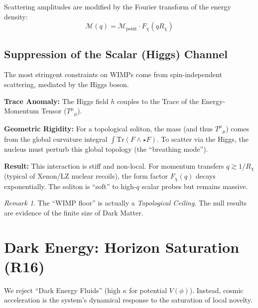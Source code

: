 \documentclass[11pt,a4paper]{article}
\theoremstyle{definition}
\theoremstyle{plain}
\theoremstyle{remark}
\newtheorem{remark}{Remark}
\newcommand{\effort}{\kappa}
\begin{document}
Scattering amplitudes are modified by the Fourier transform of the energy density:
\begin{equation}
    \mathcal{M}(q) = \mathcal{M}_{\mathrm{point}} \cdot F_\chi(q R_\chi)
\end{equation}

\subsection{Suppression of the Scalar (Higgs) Channel}

The most stringent constraints on WIMPs come from spin-independent scattering, mediated by the Higgs boson.

\textbf{Trace Anomaly:} The Higgs field $h$ couples to the Trace of the Energy-Momentum Tensor ($T^\mu{}_\mu$).

\textbf{Geometric Rigidity:} For a topological soliton, the mass (and thus $T^\mu{}_\mu$) comes from the global curvature integral $\int \mathrm{Tr}(F \wedge \star F)$. To scatter via the Higgs, the nucleus must perturb this global topology (the ``breathing mode'').

\textbf{Result:} This interaction is stiff and non-local. For momentum transfers $q \gtrsim 1/R_\chi$ (typical of Xenon/LZ nuclear recoils), the form factor $F_\chi(q)$ decays exponentially. The soliton is ``soft'' to high-$q$ scalar probes but remains massive.

\begin{remark}
The ``WIMP floor'' is actually a \emph{Topological Ceiling}. The null results are evidence of the finite size of Dark Matter.
\end{remark}

\section{Dark Energy: Horizon Saturation (R16)}

We reject ``Dark Energy Fluids'' (high $\effort$ for potential $V(\phi)$). Instead, cosmic acceleration is the system's dynamical response to the saturation of local novelty.

\end{document}
